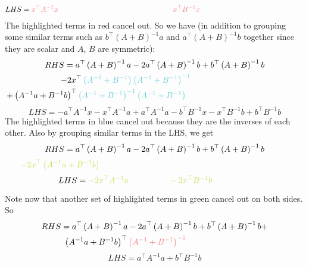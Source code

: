 \documentclass[11pt]{report} %
\begin{document}
\begin{multline}
LHS=\red x^{\top}A^{-1}x\black -a^{\top}A^{-1}x-x^{\top}A^{-1}a+a^{\top}A^{-1}a+ \red x^{\top}B^{-1}x\black -b^{\top}B^{-1}x-x^{\top}B^{-1}b+b^{\top}B^{-1}b
\end{multline}
The highlighted terms in \red red \black cancel out. So we have (in addition to grouping some similar terms such as $b^{\top}\left(A+B\right)^{-1}a$ and $a^{\top}\left(A+B\right)^{-1}b$ together since they are scalar and $A$, $B$ are symmetric):
\begin{multline}
RHS=a^{\top}\left(A+B\right)^{-1}a-2a^{\top}\left(A+B\right)^{-1}b+b^{\top}\left(A+B\right)^{-1}b \\
-2x^{\top}\blue\left(A^{-1}+B^{-1}\right)\left(A^{-1}+B^{-1}\right)^{-1}\black \left(A^{-1}a+B^{-1}b\right) \\
+\left(A^{-1}a+B^{-1}b\right)^{\top}\blue\left(A^{-1}+B^{-1}\right)^{-1}\left(A^{-1}+B^{-1}\right)\black \left(A^{-1}+B^{-1}\right)^{-1}\left(A^{-1}a+B^{-1}b\right)
\end{multline}
\begin{equation}
LHS=-a^{\top}A^{-1}x-x^{\top}A^{-1}a+a^{\top}A^{-1}a-b^{\top}B^{-1}x-x^{\top}B^{-1}b+b^{\top}B^{-1}b
\end{equation}
The highlighted terms in \blue blue \black cancel out because they are the inverses of each other. Also by grouping similar terms in the LHS, we get
\begin{multline}
RHS=a^{\top}\left(A+B\right)^{-1}a-2a^{\top}\left(A+B\right)^{-1}b+b^{\top}\left(A+B\right)^{-1}b \\
\green -2x^{\top}\left(A^{-1}a+B^{-1}b\right)\black +\left(A^{-1}a+B^{-1}b\right)^{\top}\left(A^{-1}+B^{-1}\right)^{-1}\left(A^{-1}a+B^{-1}b\right)
\end{multline}
\begin{equation}
LHS=\green -2x^{\top}A^{-1}a\black +a^{\top}A^{-1}a \green -2x^{\top}B^{-1}b\black +b^{\top}B^{-1}b
\end{equation}

Note now that another set of highlighted terms in \green green \black cancel out on both sides. So
\begin{multline}
RHS=a^{\top}\left(A+B\right)^{-1}a-2a^{\top}\left(A+B\right)^{-1}b+b^{\top}\left(A+B\right)^{-1}b+ \\
\left(A^{-1}a+B^{-1}b\right)^{\top}\red\left(A^{-1}+B^{-1}\right)^{-1}\black\left(A^{-1}a+B^{-1}b\right)
\end{multline}
\begin{equation}
LHS=a^{\top}A^{-1}a+b^{\top}B^{-1}b
\end{equation}
\end{document}
